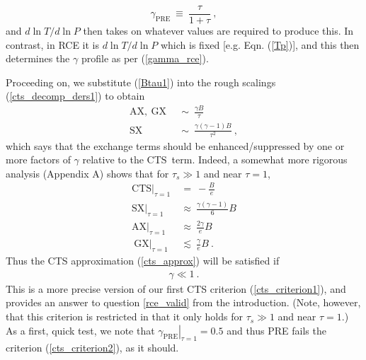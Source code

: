 \documentclass{ametsoc}
\newcommand{\beqn}{\begin{equation}}
\newcommand{\eeqn}{\end{equation}}
\newcommand{\n}{\nonumber}
\newcommand{\eqnref}[1]{(\ref{#1})}
\newcommand{\taus}{\ensuremath{\tau_s}}
\newcommand{\SX}{\ensuremath{\mathrm{SX}}}
\newcommand{\AX}{\ensuremath{\mathrm{AX}}}
\newcommand{\GX}{\ensuremath{\mathrm{GX}}}
\newcommand{\CTS}{\ensuremath{\mathrm{CTS}}}
\begin{document}
\beqn
	\gamma_{\mathrm{PRE}} \  \equiv \ \frac{\tau}{1+\tau} \ ,
	\n
\eeqn
 and $d \ln T/ d\ln P$ then takes on whatever values are required to produce this. In contrast, in RCE it is $d \ln T/ d\ln P$ which is fixed [e.g. Eqn. \eqnref{Tp}], and this then determines the $\gamma$ profile as per \eqnref{gamma_rce}.

Proceeding on, we substitute \eqnref{Btau1} into the rough scalings \eqnref{cts_decomp_ders1} to obtain 
\begin{subequations}
	\begin{align}
		\AX, \ \GX	 \ & \ \sim \ \frac{\gamma B}{\tau}  \label{ax_gx_scaling}\\
		\SX	 \ & \ \sim \ \frac{\gamma(\gamma-1)B}{\tau^2}  \ , \label{sx_scaling} 
	\end{align}
	\label{cts_decomp_ders2}
\end{subequations}
which says that the exchange terms should be enhanced/suppressed by one or more factors of $\gamma$ relative to the \CTS\ term. Indeed, a somewhat more rigorous analysis (Appendix A) shows that for $\taus \gg1 $ and near $\tau=1$,
\beqn
	\begin{split}
	 	\CTS|_{\tau=1} & \ = \  - \frac{B}{e}   \\
 		\SX|_{\tau=1} &\ \approx   \ \frac{\gamma(\gamma-1) }{6} B  \\
 		\AX|_{\tau=1} & \ \approx  \   \frac{2\gamma }{ e} B   \\
\		\GX|_{\tau=1} & \ \lesssim  \  \frac{\gamma }{ e } B   \ .
\end{split}
\label{cts_decomp_tau1}
\eeqn
Thus the CTS approximation \eqnref{cts_approx}  will be satisfied if 
\begin{align}
	 \gamma  \ll 1 \ . 
	\label{cts_criterion2}
\end{align}
This is a more precise version of our first CTS criterion \eqnref{cts_criterion1}, and provides an answer to question \ref{rce_valid} from the introduction. (Note, however, that this criterion is restricted in that it only holds for $\taus\gg 1$ and near $\tau=1$.)  As a first, quick test, we note that  $\left. \gamma_{\mathrm{PRE}}\right|_{\tau=1} =  0.5$ and thus PRE fails the criterion \eqnref{cts_criterion2}, as it should.

\end{document}
